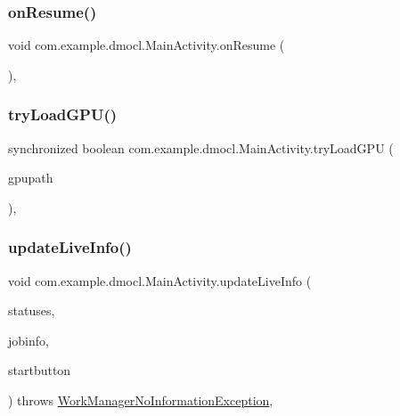 \subsubsection{\texorpdfstring{on\+Resume()}{onResume()}}
{\footnotesize\ttfamily void com.\+example.\+dmocl.\+Main\+Activity.\+on\+Resume (\begin{DoxyParamCaption}{ }\end{DoxyParamCaption})\hspace{0.3cm}{\ttfamily [inline]}, {\ttfamily [protected]}}

\mbox{\label{classcom_1_1example_1_1dmocl_1_1MainActivity_a26973c08d4b74dcce01e294077211c2f}} 
\subsubsection{\texorpdfstring{try\+Load\+G\+P\+U()}{tryLoadGPU()}}
{\footnotesize\ttfamily synchronized boolean com.\+example.\+dmocl.\+Main\+Activity.\+try\+Load\+G\+PU (\begin{DoxyParamCaption}\item[{String}]{gpupath }\end{DoxyParamCaption})\hspace{0.3cm}{\ttfamily [inline]}, {\ttfamily [protected]}}

\mbox{\label{classcom_1_1example_1_1dmocl_1_1MainActivity_a68c83a580a869fcaed554bee7fccfef4}} 
\subsubsection{\texorpdfstring{update\+Live\+Info()}{updateLiveInfo()}}
{\footnotesize\ttfamily void com.\+example.\+dmocl.\+Main\+Activity.\+update\+Live\+Info (\begin{DoxyParamCaption}\item[{List$<$ Work\+Info $>$}]{statuses,  }\item[{Text\+View}]{jobinfo,  }\item[{Button}]{startbutton }\end{DoxyParamCaption}) throws \mbox{\hyperlink{classcom_1_1example_1_1dmocl_1_1MainActivity_1_1WorkManagerNoInformationException}{Work\+Manager\+No\+Information\+Exception}}\hspace{0.3cm}{\ttfamily [inline]}, {\ttfamily [private]}}



